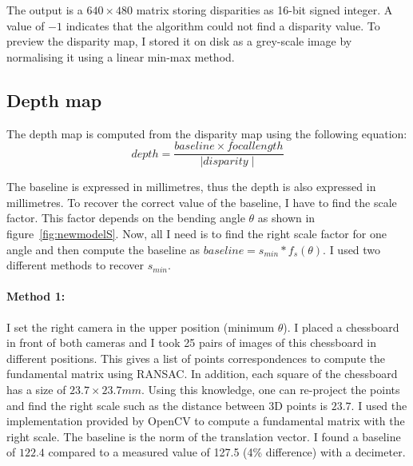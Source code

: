 \documentclass[11pt]{report}
\begin{document}
The output is a $640\times480$ matrix storing disparities as 16-bit signed integer. A value of $-1$ indicates that the algorithm could not find a disparity value. To preview the disparity map, I stored it on disk as a grey-scale image by normalising it using a linear min-max method.

\subsection{Depth map}
The depth map is computed from the disparity map using the following equation:
\begin{equation}
  depth = \frac{baseline \times focal length}{\mid disparity\mid} 
\end{equation}

The baseline is expressed in millimetres, thus the depth is also expressed in millimetres. To recover the correct value of the baseline, I have to find the scale factor. This factor depends on the bending angle $\theta$ as shown in figure~\ref{fig:newmodelS}.
Now, all I need is to find the right scale factor for one angle and then compute the baseline as $baseline = s_{min} * f_s(\theta)$. I used two different methods to recover $s_{min}$. 

\paragraph{Method 1:} I set the right camera in the upper position (minimum $\theta$). I placed a chessboard in front of both cameras and I took 25 pairs of images of this chessboard in different positions. This gives a list of points correspondences to compute the fundamental matrix using RANSAC. In addition, each square of the chessboard has a size of $23.7\times23.7mm$. Using this knowledge, one can re-project the points and find the right scale such as the distance between 3D points is $23.7$. I used the implementation provided by OpenCV to compute a fundamental matrix with the right scale. The baseline is the norm of the translation vector. I found a baseline of $122.4$ compared to a measured value of 127.5 (4\% difference) with a decimeter.
\end{document}
